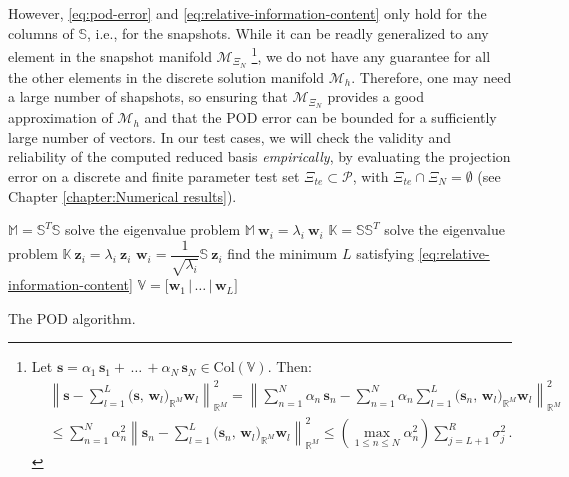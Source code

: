 \documentclass{elsarticle}
\theoremstyle{theorem}
\theoremstyle{definition}
\theoremstyle{remark}
\theoremstyle{proposition}
\numberwithin{figure}{section}
\newcommand{\norm}[1]{\left\lVert#1\right\rVert}
\begin{document}
		However, \eqref{eq:pod-error} and \eqref{eq:relative-information-content} only hold for the columns of $\mathbb{S}$, i.e., for the snapshots. While it can be readly generalized to any element in the snapshot manifold $\mathcal{M}_{\Xi_N}$ \footnote{
		Let $\mathbf{s} = \alpha_1 \, \mathbf{s}_1 + \, \ldots \, + \alpha_N \, \mathbf{s}_N \in \text{Col}(\mathbb{V})$. Then:
		\begin{equation*}
			\begin{aligned}
				& \norm{\mathbf{s} - \sum_{l = 1}^L \big( \mathbf{s}, \, \mathbf{w}_l \big)_{\mathbb{R}^M} \mathbf{w}_l}_{\mathbb{R}^M}^2 = \norm{\sum_{n = 1}^N \alpha_n \, \mathbf{s}_n - \sum_{n = 1}^N \alpha_n \sum_{l = 1}^L \big( \mathbf{s}_n, \, \mathbf{w}_l \big)_{\mathbb{R}^M} \mathbf{w}_l}_{\mathbb{R}^M}^2 \\
				& \leq \sum_{n = 1}^N \alpha_n^2 \norm{\mathbf{s}_n - \sum_{l = 1}^L \big( \mathbf{s}_n, \, \mathbf{w}_l \big)_{\mathbb{R}^M} \mathbf{w}_l}_{\mathbb{R}^M}^2 \leq \left( \max_{1 \leq n \leq N} \alpha_n^2 \right) \sum_{j = L+1}^R \sigma_j^2 \, .
			\end{aligned}
		\end{equation*}}, we do not have any guarantee for all the other elements in the discrete solution manifold $\mathcal{M}_h$. Therefore, one may need a large number of shapshots, so ensuring that $\mathcal{M}_{\Xi_N}$ provides a good approximation of $\mathcal{M}_h$ and that the POD error can be bounded for a sufficiently large number of vectors. In our test cases, we will check the validity and reliability of the computed reduced basis \emph{empirically}, by evaluating the projection error on a discrete and finite parameter test set $\Xi_{te} \subset \mathcal{P}$, with $\Xi_{te} \cap \Xi_N = \emptyset$ (see Chapter \ref{chapter:Numerical results}).
		
		\begin{algorithm}[H]	
			\begin{algorithmic}[1]
						\State $\mathbb{M} = \mathbb{S}^T \mathbb{S}$
							\State solve the eigenvalue problem $\mathbb{M} ~ \mathbf{w}_i = \lambda_i ~ \mathbf{w}_i$
						\EndFor
					\Else
						\State $\mathbb{K} = \mathbb{S} \mathbb{S}^T$
							\State solve the eigenvalue problem $\mathbb{K} ~ \mathbf{z}_i = \lambda_i ~ \mathbf{z}_i$
							\State $\mathbf{w}_i = \dfrac{1}{\sqrt{\lambda_i}} \mathbb{S} ~ \mathbf{z}_i$
						\EndFor
					\EndIf
					\State find the minimum $L$ satisfying \eqref{eq:relative-information-content}
					\State $\mathbb{V} = \big[ \mathbf{w}_1 \, \big| \, \ldots \, \big| \, \mathbf{w}_L \big]$
				\EndFunction
			\end{algorithmic}
			
			\caption{The POD algorithm.}
			\label{alg:pod}
		\end{algorithm}
	\fi
		
\end{document}
